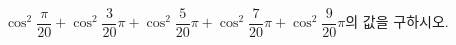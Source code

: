 $\cos^2\dfrac{\pi}{20}+\cos^2\dfrac{3}{20}\pi+\cos^2\dfrac{5}{20}\pi+\cos^2\dfrac{7}{20}\pi+\cos^2\dfrac{9}{20}\pi$의 값을 구하시오.

